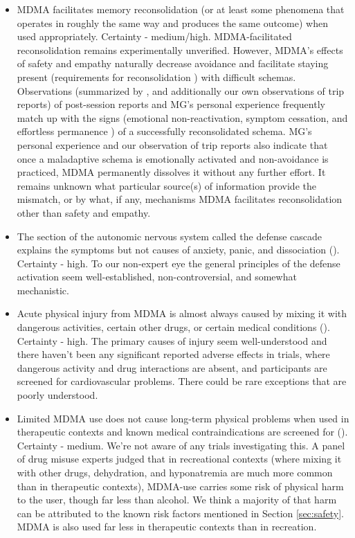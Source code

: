 \documentclass[12pt,letterpaper]{book}
\begin{document}
\begin{itemize}
	\item MDMA facilitates memory reconsolidation (or at least some phenomena that operates in roughly the same way and produces the same outcome) when used appropriately. Certainty - medium/high. MDMA-facilitated reconsolidation remains experimentally unverified. However, MDMA's effects of safety and empathy naturally decrease avoidance and facilitate staying present (requirements for reconsolidation \cite{eckerUnlocking}) with difficult schemas. Observations (summarized by \textcite{fedduciaMDMAMemoryReconsolidation}, and additionally our own observations of trip reports) of post-session reports and MG's personal experience frequently match up with the signs (emotional non-reactivation, symptom cessation, and effortless permanence \cite{eckerUnlocking}) of a successfully reconsolidated schema. MG's personal experience and our observation of trip reports also indicate that once a maladaptive schema is emotionally activated and non-avoidance is practiced, MDMA permanently dissolves it without any further effort. It remains unknown what particular source(s) of information provide the mismatch, or by what, if any, mechanisms MDMA facilitates reconsolidation other than safety and empathy.
	\item The section of the autonomic nervous system called the defense cascade explains the symptoms but not causes of anxiety, panic, and dissociation (\textcite{kozlowskaDefenseCascade}). Certainty - high. To our non-expert eye the general principles of the defense activation seem well-established, non-controversial, and somewhat mechanistic.
	\item Acute physical injury from MDMA is almost always caused by mixing it with dangerous activities, certain other drugs, or certain medical conditions (\textcite{wolfgang2025}). Certainty - high. The primary causes of injury seem well-understood and there haven't been any significant reported adverse effects in trials, where dangerous activity and drug interactions are absent, and participants are screened for cardiovascular problems. There could be rare exceptions that are poorly understood.
	\item Limited MDMA use does not cause long-term physical problems when used in therapeutic contexts and known medical contraindications are screened for (\textcite{nuttDrugHarms}). Certainty - medium. We're not aware of any trials investigating this. A panel of drug misuse experts judged that in recreational contexts (where mixing it with other drugs, dehydration, and hyponatremia are much more common than in therapeutic contexts), MDMA-use carries some risk of physical harm to the user, though far less than alcohol. We think a majority of that harm can be attributed to the known risk factors mentioned in Section \ref{sec:safety}. MDMA is also used far less in therapeutic contexts than in recreation.

\end{itemize}
\end{document}
